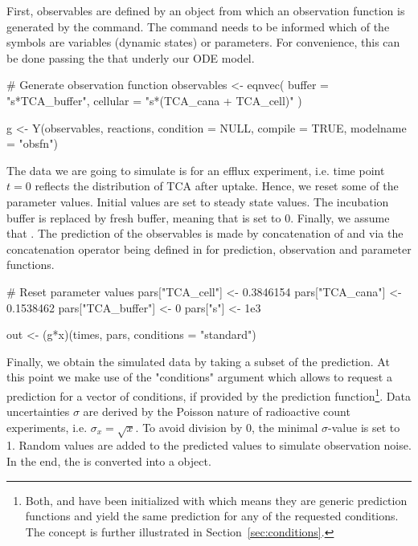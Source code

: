 \documentclass[article]{jss}
\begin{document}
First, observables are defined by an  object from which an observation function  is generated by the  command. The  command needs to be informed which of the symbols are variables (dynamic states) or parameters. For convenience, this can be done passing the  that underly our ODE model.
\begin{CodeChunk}
\begin{CodeInput}
# Generate observation function
observables <- eqnvec(
  buffer = "s*TCA_buffer",
  cellular = "s*(TCA_cana + TCA_cell)"
)

g <- Y(observables, reactions, condition = NULL,
       compile = TRUE, modelname = "obsfn")

\end{CodeInput}
\end{CodeChunk}
The data we are going to simulate is for an efflux experiment, i.e. time point $t = 0$ reflects the distribution of TCA after uptake. Hence, we reset some of the parameter values. Initial values are set to steady state values. The incubation buffer is replaced by fresh buffer, meaning that  is set to 0. Finally, we assume that . The prediction of the observables is made by concatenation of  and  via the concatenation operator  being defined in  for prediction, observation and parameter functions.
\begin{CodeChunk}
\begin{CodeInput}
# Reset parameter values
pars["TCA_cell"] <- 0.3846154
pars["TCA_cana"] <- 0.1538462
pars["TCA_buffer"] <- 0
pars["s"] <- 1e3

out <- (g*x)(times, pars, conditions = "standard")
\end{CodeInput}
\end{CodeChunk}
Finally, we obtain the simulated data by taking a subset of the prediction. At this point we make use of the "conditions" argument which allows to request a prediction for a vector of conditions, if provided by the prediction function\footnote{Both,  and  have been initialized with  which means they are generic prediction functions and yield the same prediction for any of the requested conditions. The concept is further illustrated in Section~\ref{sec:conditions}.}. Data uncertainties $\sigma$ are derived by the Poisson nature of radioactive count experiments, i.e. $\sigma_x = \sqrt{x}$. To avoid division by 0, the minimal $\sigma$-value is set to 1. Random values are added to the predicted values to simulate observation noise. In the end, the  is converted into a  object.
\end{document}
